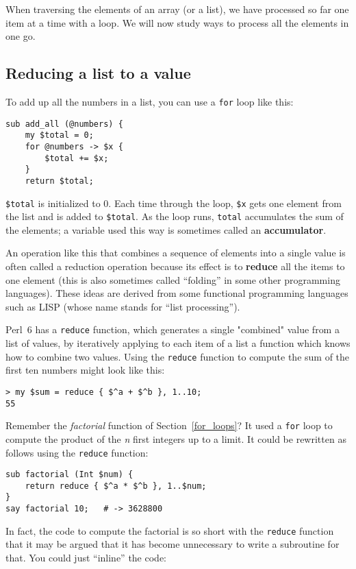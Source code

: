 When traversing the elements of an array (or a list), we have 
processed so far one item at a time with a loop. We will 
now study ways to process all the elements in one go.

\subsection{Reducing a list to a value}

To add up all the numbers in a list, you can use a {\tt for} 
loop like this:


\begin{verbatim}
sub add_all (@numbers) {
    my $total = 0;
    for @numbers -> $x {
        $total += $x;
    }
    return $total;
\end{verbatim}
%
{\tt \$total} is initialized to 0.  Each time through the loop,
{\tt \$x} gets one element from the list and is added to 
{\tt \$total}. As the loop runs, {\tt total} accumulates the 
sum of the elements; a variable used this way is sometimes 
called an {\bf accumulator}.

An operation like this that combines a sequence of elements into
a single value is often called a reduction operation because 
its effect is to {\bf reduce} all the items to one element (this 
is also sometimes called ``folding'' in some other programming 
languages). These ideas are derived from some functional 
programming languages such as LISP (whose name stands for ``list 
processing'').

Perl~6 has a {\tt reduce} function, which generates a single 
"combined" value from a list of values, by iteratively applying 
to each item of a list a function which knows how to combine two values. 
Using the {\tt reduce} function to compute the sum of the 
first ten numbers might look like this:

\begin{verbatim}
> my $sum = reduce { $^a + $^b }, 1..10;
55
\end{verbatim}

Remember the \emph{factorial} function of Section~\ref{for_loops}? 
It used a {\tt for} loop to compute the product of the \emph{n} first 
integers up to a limit. It could be rewritten as follows using the 
{\tt reduce} function:

\begin{verbatim}
sub factorial (Int $num) { 
    return reduce { $^a * $^b }, 1..$num;
}
say factorial 10;   # -> 3628800
\end{verbatim}
%
In fact, the code to compute the factorial is so short with 
the {\tt reduce} function that it may be argued that it has 
become unnecessary to write a subroutine for that. You could 
just ``inline'' the code:

